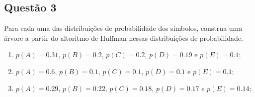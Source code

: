 \documentclass{article}
\begin{document}
        \newpage\subsection{Questão 3}
            \begin{exercise}
                Para cada uma das distribuições de probabilidade dos símbolos, construa uma árvore a partir do altoritmo de Huffman nessas distribuições de probabilidade.
                    \begin{enumerate}[noitemsep]
                        \item $p(A) = 0.31$, $p(B) = 0.2$, $p(C) = 0.2$, $p(D) = 0.19$ e $p(E) = 0.1$;

                        \item $p(A) = 0.6$, $p(B) = 0.1$, $p(C) = 0.1$, $p(D) = 0.1$ e $p(E) = 0.1$;

                        \item $p(A) = 0.29$, $p(B) = 0.22$, $p(C) = 0.18$, $p(D) = 0.17$ e $p(E) = 0.14$;
                    \end{enumerate}
            \end{exercise}
\end{document}
